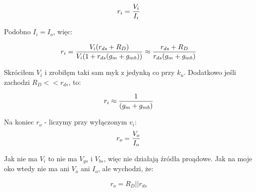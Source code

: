 \documentclass[10pt,a4paper]{article}
\begin{document}
\begin{equation}
r_i = {V_i \over I_i} 
\end{equation}

Podobno $I_i = I_o$, więc:

\begin{equation}
r_i = {V_i(r_{ds} + R_D) \over V_i(1+r_{ds}(g_m + g_{mb}))} \approx {r_{ds} + R_D \over r_{ds}(g_m + g_{mb})}
\end{equation}

Skróciłem $V_i$ i zrobiłęm taki sam myk z jedynką co przy $k_u$. Dodatkowo jeśli zachodzi $R_D << r_{ds}$, to:

\begin{equation}
r_i \approx  {1 \over (g_m + g_{mb})}
\end{equation}

Na koniec $r_o$ - liczymy przy wyłączonym $v_i$:\\

\begin{equation}
r_o = {V_o \over I_o} 
\end{equation}

Jak nie ma $V_i$ to nie ma $V_{gs}$ i $V_{bs}$, więc nie działają źródła proądowe. Jak na moje oko wtedy nie ma ani $V_o$ ani $I_o$, ale wychodzi, że:

\begin{equation}
r_o = R_D || r_{ds}
\end{equation}
\end{document}
